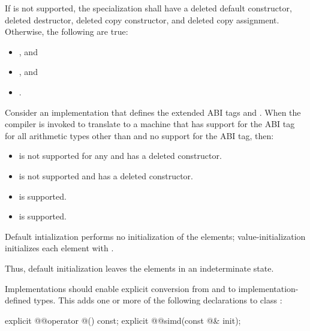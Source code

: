 If  is not supported, the specialization shall have a deleted default constructor, deleted destructor, deleted copy constructor, and deleted copy assignment.
Otherwise, the following are true:
\begin{itemize}
  \item {}, and
  \item {}, and
  \item {}.
\end{itemize}

\begin{example}
  Consider an implementation that defines the extended ABI tags  and . When the compiler is invoked to translate to a machine that has support for the  ABI tag for all arithmetic types other than  and no support for the  ABI tag, then:
  \begin{itemize}
    \item {} is not supported for any  and has a deleted constructor.
    \item {} is not supported and has a deleted constructor.
    \item {} is supported.
    \item {} is supported.
  \end{itemize}
\end{example}

\pnum
Default intialization performs no initialization of the elements; value-initialization initializes each element with . \begin{note}Thus, default initialization leaves the elements in an indeterminate state.\end{note}

\pnum
Implementations should enable explicit conversion from and to implementation-defined types. This adds one or more of the following declarations to class :

\begin{codeblock}
explicit @@operator @\impdef@() const;
explicit @@simd(const @\impdef@& init);
\end{codeblock}

